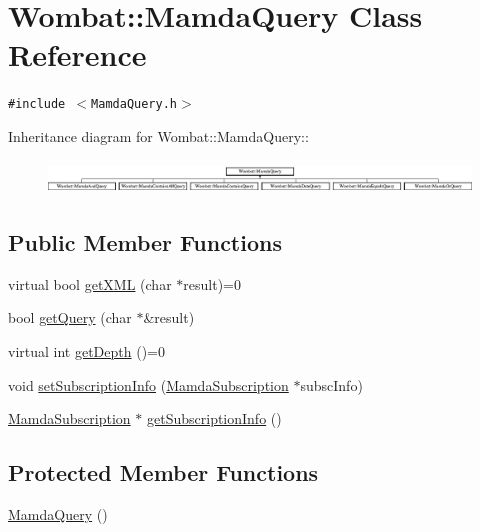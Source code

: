 \hypertarget{classWombat_1_1MamdaQuery}{
\section{Wombat::Mamda\-Query Class Reference}
\label{classWombat_1_1MamdaQuery}
}
{\tt \#include $<$Mamda\-Query.h$>$}

Inheritance diagram for Wombat::Mamda\-Query::\begin{figure}[H]
\begin{center}
\leavevmode
\includegraphics[height=0.884676cm]{classWombat_1_1MamdaQuery}
\end{center}
\end{figure}
\subsection*{Public Member Functions}
\begin{CompactItemize}
\item 
virtual bool \hyperlink{classWombat_1_1MamdaQuery_d5a4bbc29d9a752db0d07fa1e3aa2f25}{get\-XML} (char $\ast$result)=0
\item 
bool \hyperlink{classWombat_1_1MamdaQuery_22df53c6f854366ab7050050d0245e27}{get\-Query} (char $\ast$\&result)
\item 
virtual int \hyperlink{classWombat_1_1MamdaQuery_1658aee7db0fd2fce15c63293c428597}{get\-Depth} ()=0
\item 
void \hyperlink{classWombat_1_1MamdaQuery_a89e0a53c02bb823d67d1f105be0bd05}{set\-Subscription\-Info} (\hyperlink{classWombat_1_1MamdaSubscription}{Mamda\-Subscription} $\ast$subsc\-Info)
\item 
\hyperlink{classWombat_1_1MamdaSubscription}{Mamda\-Subscription} $\ast$ \hyperlink{classWombat_1_1MamdaQuery_515d92a676f606010f23404955f8ef1b}{get\-Subscription\-Info} ()
\end{CompactItemize}
\subsection*{Protected Member Functions}
\begin{CompactItemize}
\item 
\hyperlink{classWombat_1_1MamdaQuery_998f28ab677d08357fc95986e24423b6}{Mamda\-Query} ()
\end{CompactItemize}


